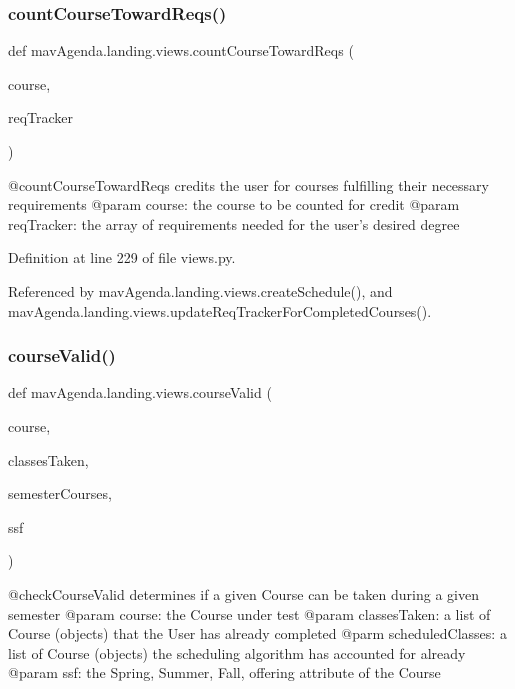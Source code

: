 \subsubsection{\texorpdfstring{count\+Course\+Toward\+Reqs()}{countCourseTowardReqs()}}
{\footnotesize\ttfamily def mav\+Agenda.\+landing.\+views.\+count\+Course\+Toward\+Reqs (\begin{DoxyParamCaption}\item[{}]{course,  }\item[{}]{req\+Tracker }\end{DoxyParamCaption})}

\begin{DoxyVerb}@countCourseTowardReqs credits the user for courses fulfilling their necessary requirements
@param course: the course to be counted for credit
@param reqTracker: the array of requirements needed for the user's desired degree
\end{DoxyVerb}
 

Definition at line 229 of file views.\+py.



Referenced by mav\+Agenda.\+landing.\+views.\+create\+Schedule(), and mav\+Agenda.\+landing.\+views.\+update\+Req\+Tracker\+For\+Completed\+Courses().

\mbox{\label{namespacemavAgenda_1_1landing_1_1views_ac91e55945f21284a5dc9abd24cac6690}} 
\subsubsection{\texorpdfstring{course\+Valid()}{courseValid()}}
{\footnotesize\ttfamily def mav\+Agenda.\+landing.\+views.\+course\+Valid (\begin{DoxyParamCaption}\item[{}]{course,  }\item[{}]{classes\+Taken,  }\item[{}]{semester\+Courses,  }\item[{}]{ssf }\end{DoxyParamCaption})}

\begin{DoxyVerb}@checkCourseValid determines if a given Course can be taken during a given semester
@param course: the Course under test
@param classesTaken: a list of Course (objects) that the User has already completed
@parm scheduledClasses: a list of Course (objects) the scheduling algorithm has accounted for already
@param ssf: the Spring, Summer, Fall, offering attribute of the Course
\end{DoxyVerb}
 


